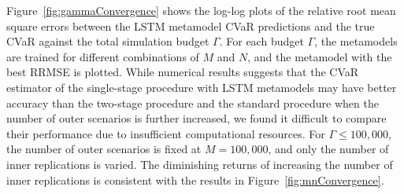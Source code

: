 \documentclass{article}
\begin{document}
Figure~\ref{fig:gammaConvergence} shows the log-log plots of the relative root mean square errors between the LSTM metamodel CVaR predictions and the true CVaR against the total simulation budget $\Gamma$.
For each budget $\Gamma$, the metamodels are trained for different combinations of $M$ and $N$, and the metamodel with the best RRMSE is plotted.
While numerical results suggests that the CVaR estimator of the single-stage procedure with LSTM metamodels may have better accuracy than the two-stage procedure and the standard procedure when the number of outer scenarios is further increased, we found it difficult to compare their performance due to insufficient computational resources.
For $\Gamma \leq 100\!,000$, the number of outer scenarios is fixed at $M = 100\!,000$, and only the number of inner replications is varied.
The diminishing returns of increasing the number of inner replications is consistent with the results in Figure~\ref{fig:mnConvergence}.
\end{document}
